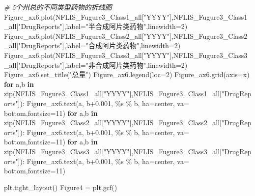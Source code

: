 \documentclass[
]{article}
\newenvironment{Shaded}{}{}
\newcommand{\BuiltInTok}[1]{#1}
\newcommand{\CommentTok}[1]{\textcolor[rgb]{0.38,0.63,0.69}{\textit{#1}}}
\newcommand{\ControlFlowTok}[1]{\textcolor[rgb]{0.00,0.44,0.13}{\textbf{#1}}}
\newcommand{\DecValTok}[1]{\textcolor[rgb]{0.25,0.63,0.44}{#1}}
\newcommand{\FloatTok}[1]{\textcolor[rgb]{0.25,0.63,0.44}{#1}}
\newcommand{\KeywordTok}[1]{\textcolor[rgb]{0.00,0.44,0.13}{\textbf{#1}}}
\newcommand{\NormalTok}[1]{#1}
\newcommand{\OperatorTok}[1]{\textcolor[rgb]{0.40,0.40,0.40}{#1}}
\newcommand{\SpecialCharTok}[1]{\textcolor[rgb]{0.25,0.44,0.63}{#1}}
\newcommand{\StringTok}[1]{\textcolor[rgb]{0.25,0.44,0.63}{#1}}
\begin{document}
\begin{Shaded}
\begin{Highlighting}[]
\CommentTok{\# 5个州总的不同类型药物的折线图}
\NormalTok{Figure\_ax6.plot(NFLIS\_Fugure3\_Class1\_all[}\StringTok{"YYYY"}\NormalTok{],NFLIS\_Fugure3\_Class1\_all[}\StringTok{"DrugReports"}\NormalTok{],label}\OperatorTok{=}\StringTok{"半合成阿片类药物"}\NormalTok{,linewidth}\OperatorTok{=}\DecValTok{2}\NormalTok{)}
\NormalTok{Figure\_ax6.plot(NFLIS\_Fugure3\_Class2\_all[}\StringTok{"YYYY"}\NormalTok{],NFLIS\_Fugure3\_Class2\_all[}\StringTok{"DrugReports"}\NormalTok{],label}\OperatorTok{=}\StringTok{"合成阿片类药物"}\NormalTok{,linewidth}\OperatorTok{=}\DecValTok{2}\NormalTok{)}
\NormalTok{Figure\_ax6.plot(NFLIS\_Fugure3\_Class3\_all[}\StringTok{"YYYY"}\NormalTok{],NFLIS\_Fugure3\_Class3\_all[}\StringTok{"DrugReports"}\NormalTok{],label}\OperatorTok{=}\StringTok{"非合成阿片类药物"}\NormalTok{,linewidth}\OperatorTok{=}\DecValTok{2}\NormalTok{)}
\NormalTok{Figure\_ax6.set\_title(}\StringTok{"总量"}\NormalTok{)}
\NormalTok{Figure\_ax6.legend(loc}\OperatorTok{=}\DecValTok{2}\NormalTok{)}
\NormalTok{Figure\_ax6.grid(axis}\OperatorTok{=}\StringTok{\textquotesingle{}x\textquotesingle{}}\NormalTok{)}
\ControlFlowTok{for}\NormalTok{ a,b }\KeywordTok{in} \BuiltInTok{zip}\NormalTok{(NFLIS\_Fugure3\_Class1\_all[}\StringTok{"YYYY"}\NormalTok{],NFLIS\_Fugure3\_Class1\_all[}\StringTok{"DrugReports"}\NormalTok{]):}
\NormalTok{    Figure\_ax6.text(a, b}\OperatorTok{+}\FloatTok{0.001}\NormalTok{, }\StringTok{\textquotesingle{}}\SpecialCharTok{\%s}\StringTok{\textquotesingle{}} \OperatorTok{\%}\NormalTok{ b, ha}\OperatorTok{=}\StringTok{\textquotesingle{}center\textquotesingle{}}\NormalTok{, va}\OperatorTok{=} \StringTok{\textquotesingle{}bottom\textquotesingle{}}\NormalTok{,fontsize}\OperatorTok{=}\DecValTok{11}\NormalTok{)}
\ControlFlowTok{for}\NormalTok{ a,b }\KeywordTok{in} \BuiltInTok{zip}\NormalTok{(NFLIS\_Fugure3\_Class2\_all[}\StringTok{"YYYY"}\NormalTok{],NFLIS\_Fugure3\_Class2\_all[}\StringTok{"DrugReports"}\NormalTok{]):}
\NormalTok{    Figure\_ax6.text(a, b}\OperatorTok{+}\FloatTok{0.001}\NormalTok{, }\StringTok{\textquotesingle{}}\SpecialCharTok{\%s}\StringTok{\textquotesingle{}} \OperatorTok{\%}\NormalTok{ b, ha}\OperatorTok{=}\StringTok{\textquotesingle{}center\textquotesingle{}}\NormalTok{, va}\OperatorTok{=} \StringTok{\textquotesingle{}bottom\textquotesingle{}}\NormalTok{,fontsize}\OperatorTok{=}\DecValTok{11}\NormalTok{)}
\ControlFlowTok{for}\NormalTok{ a,b }\KeywordTok{in} \BuiltInTok{zip}\NormalTok{(NFLIS\_Fugure3\_Class3\_all[}\StringTok{"YYYY"}\NormalTok{],NFLIS\_Fugure3\_Class3\_all[}\StringTok{"DrugReports"}\NormalTok{]):}
\NormalTok{    Figure\_ax6.text(a, b}\OperatorTok{+}\FloatTok{0.001}\NormalTok{, }\StringTok{\textquotesingle{}}\SpecialCharTok{\%s}\StringTok{\textquotesingle{}} \OperatorTok{\%}\NormalTok{ b, ha}\OperatorTok{=}\StringTok{\textquotesingle{}center\textquotesingle{}}\NormalTok{, va}\OperatorTok{=} \StringTok{\textquotesingle{}bottom\textquotesingle{}}\NormalTok{,fontsize}\OperatorTok{=}\DecValTok{11}\NormalTok{)}

\NormalTok{plt.tight\_layout()}
\NormalTok{Figure4 }\OperatorTok{=}\NormalTok{ plt.gcf()}
\end{Highlighting}
\end{Shaded}
\end{document}
